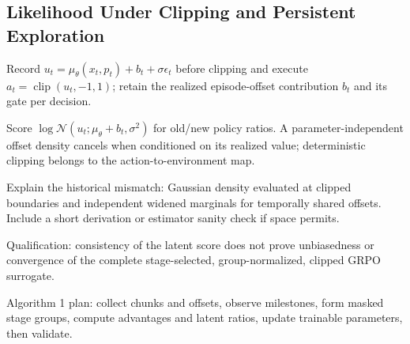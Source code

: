 \subsection{Likelihood Under Clipping and Persistent Exploration}
\begin{outline}
\item Record $u_t=\mu_\theta(x_t,p_t)+b_t+\sigma\epsilon_t$ before clipping and execute $a_t=\operatorname{clip}(u_t,-1,1)$; retain the realized episode-offset contribution $b_t$ and its gate per decision.
\item Score $\log\mathcal{N}(u_t;\mu_\theta+b_t,\sigma^2)$ for old/new policy ratios. A parameter-independent offset density cancels when conditioned on its realized value; deterministic clipping belongs to the action-to-environment map.
\item Explain the historical mismatch: Gaussian density evaluated at clipped boundaries and independent widened marginals for temporally shared offsets. Include a short derivation or estimator sanity check if space permits.
\item Qualification: consistency of the latent score does not prove unbiasedness or convergence of the complete stage-selected, group-normalized, clipped GRPO surrogate.
\item Algorithm 1 plan: collect chunks and offsets, observe milestones, form masked stage groups, compute advantages and latent ratios, update trainable parameters, then validate.
\end{outline}
